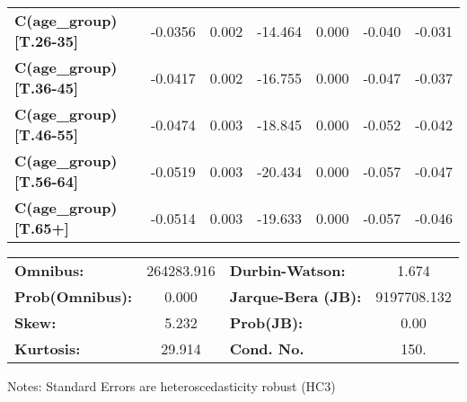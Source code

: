 \begin{center}
\begin{tabular}{lcccccc}
\textbf{C(age\_group)[T.26-35]}                                                   &      -0.0356  &        0.002     &   -14.464  &         0.000        &       -0.040    &       -0.031     \\
\textbf{C(age\_group)[T.36-45]}                                                   &      -0.0417  &        0.002     &   -16.755  &         0.000        &       -0.047    &       -0.037     \\
\textbf{C(age\_group)[T.46-55]}                                                   &      -0.0474  &        0.003     &   -18.845  &         0.000        &       -0.052    &       -0.042     \\
\textbf{C(age\_group)[T.56-64]}                                                   &      -0.0519  &        0.003     &   -20.434  &         0.000        &       -0.057    &       -0.047     \\
\textbf{C(age\_group)[T.65+]}                                                     &      -0.0514  &        0.003     &   -19.633  &         0.000        &       -0.057    &       -0.046     \\
\bottomrule
\end{tabular}
\begin{tabular}{lclc}
\textbf{Omnibus:}       & 264283.916 & \textbf{  Durbin-Watson:     } &      1.674   \\
\textbf{Prob(Omnibus):} &    0.000   & \textbf{  Jarque-Bera (JB):  } & 9197708.132  \\
\textbf{Skew:}          &    5.232   & \textbf{  Prob(JB):          } &       0.00   \\
\textbf{Kurtosis:}      &   29.914   & \textbf{  Cond. No.          } &       150.   \\
\bottomrule
\end{tabular}
\end{center}

Notes: \newline
 [1] Standard Errors are heteroscedasticity robust (HC3)